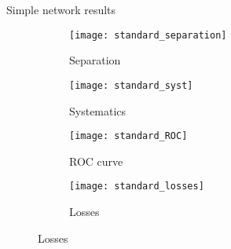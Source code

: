 \begin{frame}{Simple network results}
\vspace{-2mm}
\begin{figure}[htbp]
    \centering
    \begin{subfigure}[b]{0.4\textwidth}
        \texttt{[image: standard\_separation]}
        \caption{Separation}
        \label{fig:simple:final:sepa}
    \end{subfigure}
\quad
    \begin{subfigure}[b]{0.4\textwidth}
        \texttt{[image: standard\_syst]}
        \caption{Systematics}
        \label{fig:simple:final:syst}
    \end{subfigure}

    \begin{subfigure}[b]{0.4\textwidth}
		\texttt{[image: standard\_ROC]}
		\caption{ROC curve}
		\label{fig:simple:final:roc}
	\end{subfigure}
\quad
	\begin{subfigure}[b]{0.4\textwidth}
		\texttt{[image: standard\_losses]}
		\caption{Losses}
		\label{fig:simple:final:loss}
	\end{subfigure}
\end{figure}
\end{frame}